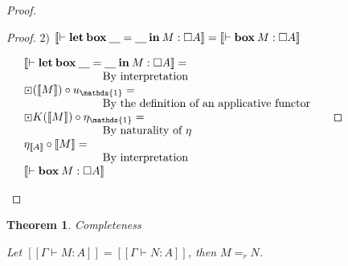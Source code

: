 \documentclass[a4paper]{article}
\newtheorem{theorem}{Theorem}
\begin{document}
\begin{proof}
\begin{proof}
\vspace{\baselineskip}

2) $[\![\vdash {\bf let \: box \:} \underline{\quad} = \underline {\quad} {\: \bf in \:} M : \Box A]\!] = [\![\vdash {\bf box \:} M : \Box A]\!]$

$\begin{array}{lll}
&[\![\vdash {\bf let \: box \:} \underline{\quad} = \underline {\quad} {\: \bf in \:} M : \Box A]\!] = & \\
&\quad\quad\quad\quad\quad\quad\quad \text{By interpretation}& \\
&\boxdot ([\![M]\!]) \circ u_{\mathds{1}} = & \\
&\quad\quad\quad\quad\quad\quad\quad \text{By the definition of an applicative functor}& \\
&\boxdot {K}([\![M]\!]) \circ \eta_{\mathds{1}} = & \\
&\quad\quad\quad\quad\quad\quad\quad \text{By naturality of $\eta$} & \\
&\eta_{[\![A]\!]} \circ [\![M]\!] = &\\
&\quad\quad\quad\quad\quad\quad\quad \text{By interpretation} & \\
&[\![\vdash {\bf box \:} M : \Box A]\!]&
\end{array}$
\end{proof}

\end{proof}

\begin{theorem} Completeness

Let $[\![\Gamma \vdash M : A]\!] = [\![\Gamma \vdash N : A]\!]$, then $M =_r N$.
\end{theorem}
\end{document}
